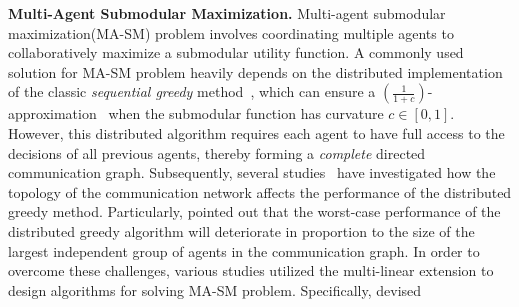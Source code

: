 \textbf{Multi-Agent Submodular Maximization.} Multi-agent submodular maximization(MA-SM) problem involves coordinating multiple agents to collaboratively maximize a submodular utility function. A commonly used solution for MA-SM problem heavily depends on the distributed implementation of the classic \emph{sequential greedy} method~\citep{fisher1978analysis}, which can ensure a $(\frac{1}{1+c})$-approximation~\citep{conforti1984submodular} when the submodular function has curvature $c\in[0,1]$. However, this distributed algorithm requires each agent to have full access to the decisions of all previous agents, thereby forming a \emph{complete} directed communication graph. Subsequently, several studies~\citep{grimsman2018impact,gharesifard2017distributed,marden2016role} have investigated how the topology of the communication network affects the performance of the distributed greedy method. Particularly, \citet{grimsman2018impact} pointed out that the worst-case performance of the distributed greedy algorithm will deteriorate in proportion to the size of the largest independent group of agents in the communication graph. In order to overcome these challenges, various studies \citep{rezazadeh2023distributed,robey2021optimal,du2022jacobi} utilized the multi-linear extension to design algorithms for solving MA-SM problem. Specifically, \citet{du2022jacobi} devised
